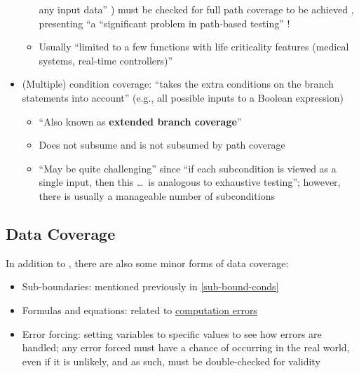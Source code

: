 \begin{itemize}
\begin{itemize}
                        any input data'' \citep[p.~5-5]{SWEBOK2024}) must be
                        checked for full path coverage to be achieved
                        \citep[p.~439]{PetersAndPedrycz2000}, presenting ``a
                        ``significant problem in path-based testing''
                        \citep[p.~5-5]{SWEBOK2024}!
                  \item Usually ``limited to a few functions with life
                        criticality features (medical systems, real-time
                        controllers)'' \citep[p.~481]{PetersAndPedrycz2000}
            \end{itemize}
      \item (Multiple) condition coverage: ``takes the extra conditions on the
            branch statements into account'' (e.g., all possible inputs to a
            Boolean expression) \citep[p.~120]{Patton2006}
            \begin{itemize}
                  \item ``Also known as \textbf{extended branch coverage}''
                        \citep[p.~422]{vanVliet2000}
                  \item Does not subsume and is not subsumed by path coverage
                        \citep[p.~433]{vanVliet2000}
                  \item ``May be quite challenging'' since ``if each
                        subcondition is viewed as a single input, then this
                        \dots\ is analogous to exhaustive testing''; however,
                        there is usually a manageable number of subconditions
                        \citep[p.~464]{PetersAndPedrycz2000}
            \end{itemize}
\end{itemize}

\subsection[Data Coverage]{Data Coverage \citep[pp.~114-116]{Patton2006}}

In addition to , there are also some minor forms of
data coverage:

\begin{itemize}
      \item Sub-boundaries: mentioned previously in \ref{sub-bound-conds}
      \item Formulas and equations: related to
            \hyperref[comp-errors]{computation errors}
      \item Error forcing: setting variables to specific values to see how
            errors are handled; any error forced must have a chance of
            occurring in the real world, even if it is unlikely, and as such,
            must be double-checked for validity
            \citep[p.~116]{Patton2006}
\end{itemize}

